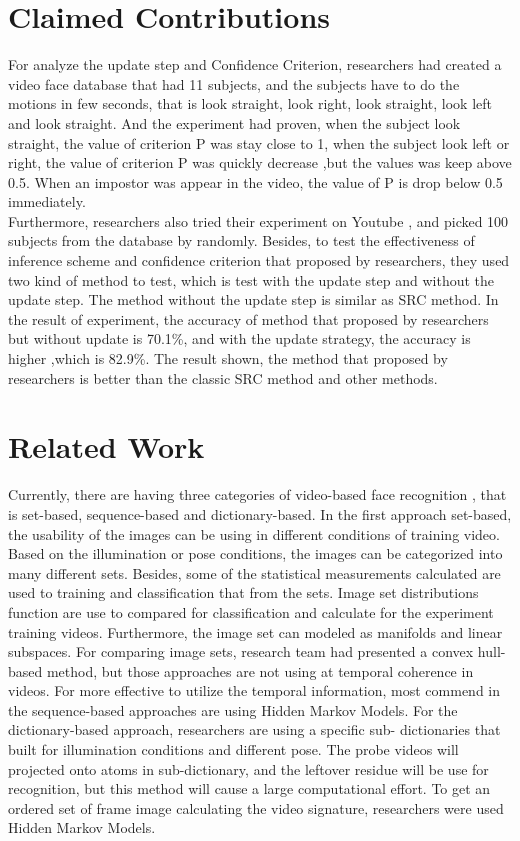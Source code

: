 \documentclass[12pt]{article}
\begin{document}
\section{Claimed Contributions}
\hspace{1cm}For analyze the update step and Confidence Criterion, researchers had created a video face database that had 11 subjects, and the subjects have to do the motions in few seconds, that is look straight, look right, look straight, look left and look straight. And the experiment had proven, when the subject look straight, the value of criterion P was stay close to 1, when the subject look left or right, the value of criterion P was quickly decrease ,but the values was keep above 0.5. When an impostor was appear in the video, the value of P is drop below 0.5 immediately. \vspace{3mm}\\ 
\hspace{1cm}Furthermore, researchers also tried their experiment on Youtube , and picked 100 subjects from the database by randomly. Besides, to test the effectiveness of inference scheme and confidence criterion that proposed by researchers, they used two kind of method to test, which is test with the update step and without the update step. The method without the update step is similar as SRC method. In the result of experiment, the accuracy of method that proposed by researchers but without update is 70.1\%, and with the update strategy, the accuracy is higher ,which is 82.9\%. The result shown, the method that proposed by researchers is better than the classic SRC method and other methods.


\section{Related Work}
\hspace{1cm}Currently, there are having three categories of video-based face recognition , that is set-based, sequence-based and dictionary-based.  In the first approach set-based, the usability of the images can be using in different conditions of training video. Based on the illumination or pose conditions, the images can be categorized into many different sets. Besides, some of the  statistical measurements calculated are used to training and classification that from the sets. Image set distributions function are use to compared for classification and calculate for the experiment training videos. Furthermore, the image set can modeled as manifolds and linear subspaces. For comparing image sets, research team had presented a convex hull-based method, but those approaches are not using at temporal coherence in videos. For more effective to utilize the temporal information, most commend in the sequence-based approaches are using Hidden Markov Models. For the dictionary-based approach, researchers are using a specific sub- dictionaries that built for illumination conditions and different pose. The probe videos will projected onto atoms in sub-dictionary, and the leftover residue will be use for recognition, but this method will cause a large computational effort. To get an ordered set of frame image calculating the video signature, researchers were used Hidden Markov Models.  
\end{document}

